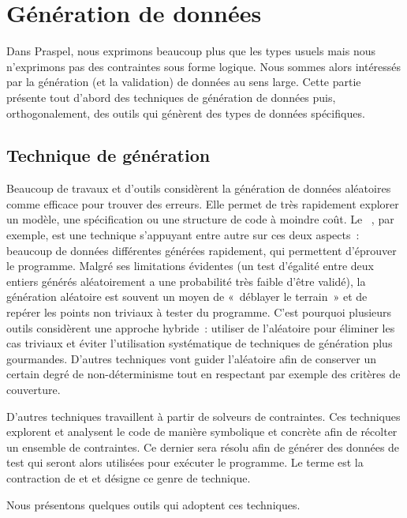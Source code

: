 \section{Génération de données}
\label{section:sota:data_generation}

Dans Praspel, nous exprimons beaucoup plus que les types usuels mais nous
n'exprimons pas des contraintes sous forme logique. Nous sommes alors intéressés
par la génération (et la validation) de données au sens large. Cette partie
présente tout d'abord des techniques de génération de données puis,
orthogonalement, des outils qui génèrent des types de données spécifiques.

\subsection{Technique de génération}

Beaucoup de travaux et d'outils considèrent la génération de données aléatoires
comme efficace pour trouver des erreurs. Elle permet de très rapidement explorer
un modèle, une spécification ou une structure de code à moindre coût. Le
~, par exemple, est une technique
s'appuyant entre autre sur ces deux aspects~: beaucoup de données différentes
générées rapidement, qui permettent d'éprouver le programme. Malgré ses
limitations évidentes (un test d'égalité entre deux entiers générés
aléatoirement a une probabilité très faible d'être validé), la génération
aléatoire est souvent un moyen de «~déblayer le terrain~» et de repérer les
points non triviaux à tester du programme. C'est pourquoi plusieurs outils
considèrent une approche hybride~: utiliser de l'aléatoire pour éliminer les cas
triviaux et éviter l'utilisation systématique de techniques de génération plus
gourmandes. D'autres techniques vont guider l'aléatoire afin de conserver un
certain degré de non-déterminisme tout en respectant par exemple des critères de
couverture.

D'autres techniques travaillent à partir de solveurs de contraintes. Ces
techniques explorent et analysent le code de manière symbolique et concrète afin
de récolter un ensemble de contraintes. Ce dernier sera résolu afin de générer
des données de test qui seront alors utilisées pour exécuter le programme. Le
terme  est la contraction de  et
 et désigne ce genre de technique.

Nous présentons quelques outils qui adoptent ces techniques.

